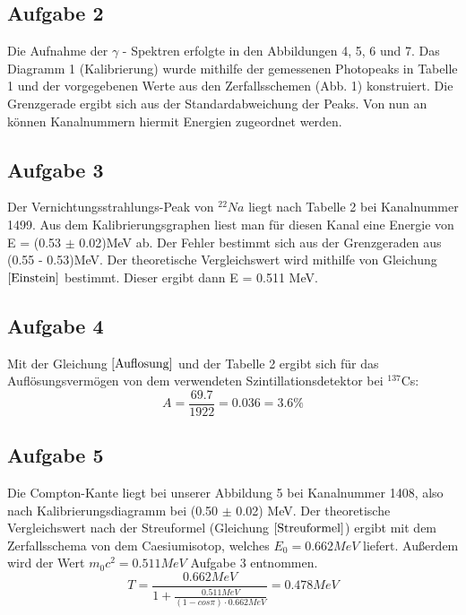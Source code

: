 \documentclass[11pt,a4paper]{article}
\begin{document}
     \subsection{Aufgabe 2}
     Die Aufnahme der $\gamma$ - Spektren erfolgte in den Abbildungen 4, 5, 6 und 7.
   Das Diagramm 1 (Kalibrierung) wurde mithilfe der gemessenen Photopeaks in Tabelle 1 und der vorgegebenen Werte aus den Zerfallsschemen (Abb. 1) konstruiert. 
   Die Grenzgerade ergibt sich aus der Standardabweichung der Peaks.
    Von nun an k\"onnen Kanalnummern hiermit Energien zugeordnet werden.
   
  \subsection{Aufgabe 3}
   Der Vernichtungsstrahlungs-Peak von $^{22}{Na}$ liegt nach Tabelle 2 bei Kanalnummer 1499. Aus dem Kalibrierungsgraphen liest man für diesen Kanal eine Energie von E = (0.53 $\pm$ 0.02)MeV ab. Der Fehler bestimmt sich aus der Grenzgeraden aus (0.55 - 0.53)MeV.
   Der theoretische Vergleichswert wird mithilfe von Gleichung $\ref{Einstein}$ bestimmt. Dieser ergibt dann E = 0.511 MeV.
   \subsection{Aufgabe 4}
   Mit der Gleichung $\ref{Auflosung}$ und der Tabelle 2 ergibt sich f\"ur das Aufl\"osungsverm\"ogen von dem verwendeten Szintillationsdetektor bei $^{137}$Cs:
   \begin{equation}
   	A = \frac{69.7}{1922} = 0.036 = 3.6\%
   \end{equation}
  \subsection{Aufgabe 5}
   Die Compton-Kante liegt bei unserer Abbildung 5 bei Kanalnummer 1408, also nach Kalibrierungsdiagramm bei (0.50 $\pm$ 0.02) MeV.
   Der theoretische Vergleichswert nach der Streuformel (Gleichung $\ref{Streuformel}$) ergibt mit dem Zerfallsschema von dem Caesiumisotop, welches $E_0 = 0.662MeV$ liefert. Au\ss erdem wird der Wert $m_0c^2 = 0.511MeV$ Aufgabe 3 entnommen.
   \begin{equation}
    T = \frac{0.662 MeV}{1+\frac{0.511 MeV}{(1-cos \pi)\cdot 0.662 MeV}} = 0.478 MeV
   \end{equation}
\end{document}
